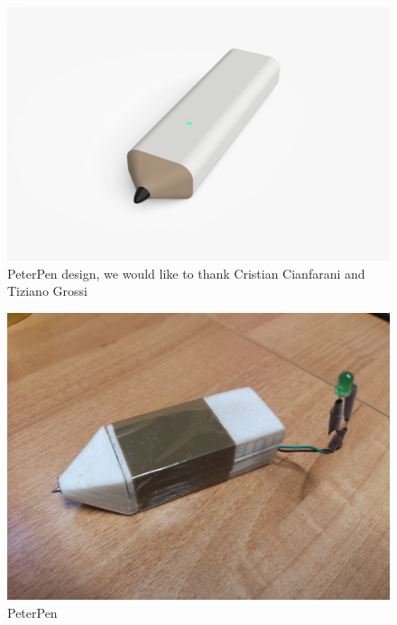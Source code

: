 \documentclass[8pt,notitlepage]{report}
\begin{document}
		\begin{figure}[H]
			\begin{center}
				\includegraphics[scale=.1]{design}
				\caption{PeterPen design, we would like to thank Cristian Cianfarani and Tiziano Grossi}
			\end{center}
		\end{figure}		
		
		\begin{figure}[H]
			\begin{center}
				\includegraphics[scale=.105]{peterpen}
				\caption{PeterPen}
			\end{center}
		\end{figure}
		
\end{document}
